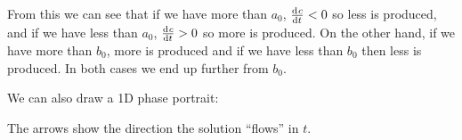\documentclass[../main.tex]{subfiles}
\begin{document}
\begin{example}
\begin{center}
  \end{center}
  From this we can see that if we have more than $a_0$, $\deriv{c}{t} < 0$ so less is produced, and if we have less than $a_0$, $\deriv{c}{t} > 0$ so more is produced.
  On the other hand, if we have more than $b_0$, more is produced and if we have less than $b_0$ then less is produced.
  In both cases we end up further from $b_0$.

  We can also draw a 1D phase portrait:
  \begin{center}
  \end{center}
  The arrows show the direction the solution ``flows'' in $t$.
\end{example}
\end{document}
